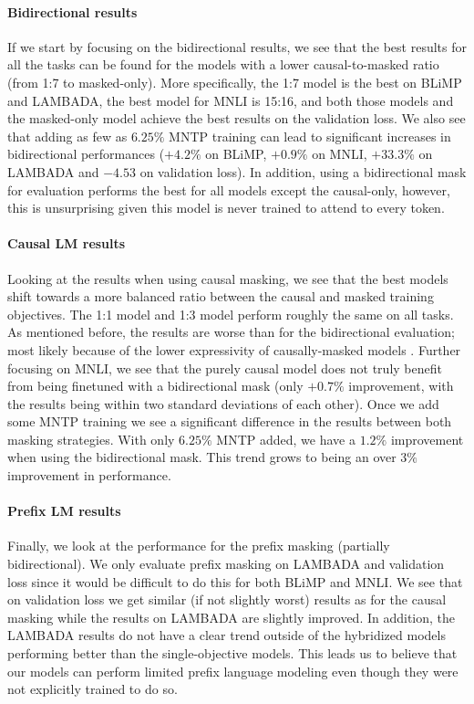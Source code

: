 \paragraph{Bidirectional results} If we start by focusing on the bidirectional results, we see that the best results for all the tasks can be found for the models with a lower causal-to-masked ratio (from 1:7 to masked-only). More specifically, the 1:7 model is the best on BLiMP and LAMBADA, the best model for MNLI is 15:16, and both those models and the masked-only model achieve the best results on the validation loss. We also see that adding as few as $6.25\%$ MNTP training can lead to significant increases in bidirectional performances ($+4.2\%$ on BLiMP, $+0.9\%$ on MNLI, $+33.3\%$ on LAMBADA and $-4.53$ on validation loss). In addition, using a bidirectional mask for evaluation performs the best for all models except the causal-only, however, this is unsurprising given this model is never trained to attend to every token.%

\paragraph{Causal LM results} Looking at the results when using causal masking, we see that the best models shift towards a more balanced ratio between the causal and masked training objectives. The 1:1 model and 1:3 model perform roughly the same on all tasks. As mentioned before, the results are worse than for the bidirectional evaluation; most likely because of the lower expressivity of causally-masked models \citep{ewer2024entpencoderonlytokenprediction}. Further focusing on MNLI, we see that the purely causal model does not truly benefit from being finetuned with a bidirectional mask (only $+0.7\%$ improvement, with the results being within two standard deviations of each other). Once we add some MNTP training we see a significant difference in the results between both masking strategies. With only $6.25\%$ MNTP added, we have a $1.2\%$ improvement when using the bidirectional mask. This trend grows to being an over $3\%$ improvement in performance.

\paragraph{Prefix LM results} Finally, we look at the performance for the prefix masking (partially bidirectional). We only evaluate prefix masking on LAMBADA and validation loss since it would be difficult to do this for both BLiMP and MNLI. We see that on validation loss we get similar (if not slightly worst) results as for the causal masking while the results on LAMBADA are slightly improved. In addition, the LAMBADA results do not have a clear trend outside of the hybridized models performing better than the single-objective models. This leads us to believe that our models can perform limited prefix language modeling even though they were not explicitly trained to do so.

